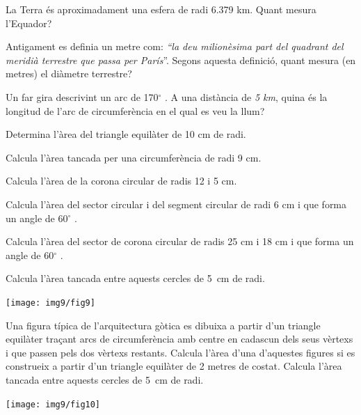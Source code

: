 \begin{mylist}

 


\exer  La Terra és aproximadament una esfera de radi 6.379 km. Quant mesura l'Equador?

\exer  Antigament es definia un metre com: \textit{``la deu milionèsima part del quadrant del meridià terrestre que passa per París}''. Segons aquesta definició, quant mesura (en metres) el diàmetre terrestre? 

\exer   Un far gira descrivint un arc de 170${}^\circ$ . A una distància de \textit{5 km}, quina és la longitud de l'arc de circumferència en el qual es veu la llum?

\exer  Determina l'àrea  del triangle equilàter de 10 cm de radi.

\exer  Calcula l'àrea tancada per una circumferència de radi 9 cm.

\exer  Calcula l'àrea de la corona circular de radis 12 i 5 cm.

\exer  Calcula l'àrea del sector circular i del segment circular de radi 6 cm i que forma un angle de 60${}^\circ$ . 

\exer  Calcula l'àrea del sector de corona circular de radis 25 cm i 18 cm i que forma un angle de 60${}^\circ$ . 

\exer[1]  Calcula l'àrea tancada entre aquests cercles de 5~cm de radi.
\begin{center}
	\texttt{[image: img9/fig9]}
\end{center}

\vspace*{-1.5cm}
\exer \begin{minipage}[t]{0.7\textwidth}
	Una figura típica de l'arquitectura gòtica es dibuixa a partir d'un triangle equilàter traçant arcs de circumferència amb centre en cadascun dels seus vèrtexs i que passen pels dos vèrtexs restants. Calcula l'àrea d'una d'aquestes figures si es construeix a partir d'un triangle equilàter de 2 metres de costat. Calcula l'àrea tancada entre aquests cercles de 5~cm de radi.
\end{minipage}
\begin{minipage}{0.3\textwidth}
	\centering
	\vspace{2cm}
	\texttt{[image: img9/fig10]}
\end{minipage}


\end{mylist}
